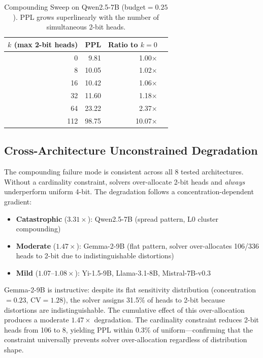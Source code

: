 \documentclass[11pt,a4paper]{article}
\begin{document}
\begin{table}[h]
\centering
\caption{Compounding Sweep on Qwen2.5-7B (budget$=0.25$). PPL grows superlinearly with the number of simultaneous 2-bit heads.}
\label{tab:compounding_sweep}
\begin{tabular}{@{}rrrr@{}}
\toprule
$k$ (max 2-bit heads) & PPL & Ratio to $k{=}0$ \\
\midrule
0  & 9.81  & 1.00$\times$ \\
8  & 10.05 & 1.02$\times$ \\
16 & 10.42 & 1.06$\times$ \\
32 & 11.60 & 1.18$\times$ \\
64 & 23.22 & 2.37$\times$ \\
112 & 98.75 & 10.07$\times$ \\
\bottomrule
\end{tabular}
\end{table}

\subsection{Cross-Architecture Unconstrained Degradation}

The compounding failure mode is consistent across all 8 tested architectures.
Without a cardinality constraint, solvers over-allocate 2-bit heads and \emph{always} underperform uniform 4-bit.
The degradation follows a concentration-dependent gradient:
\begin{itemize}[leftmargin=*,itemsep=1pt]
\item \textbf{Catastrophic} ($3.31\times$): Qwen2.5-7B (spread pattern, L0 cluster compounding)
\item \textbf{Moderate} ($1.47\times$): Gemma-2-9B (flat pattern, solver over-allocates 106/336 heads to 2-bit due to indistinguishable distortions)
\item \textbf{Mild} ($1.07$--$1.08\times$): Yi-1.5-9B, Llama-3.1-8B, Mistral-7B-v0.3
\end{itemize}

Gemma-2-9B is instructive: despite its flat sensitivity distribution (concentration$=0.23$, CV$=1.28$), the solver assigns 31.5\% of heads to 2-bit because distortions are indistinguishable.
The cumulative effect of this over-allocation produces a moderate $1.47\times$ degradation.
The cardinality constraint reduces 2-bit heads from 106 to 8, yielding PPL within 0.3\% of uniform---confirming that the constraint universally prevents solver over-allocation regardless of distribution shape.
\end{document}
